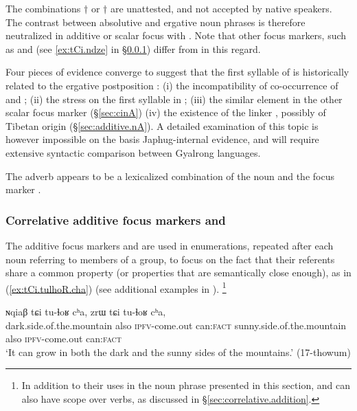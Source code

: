 The combinations $\dagger$ or $\dagger$ are unattested, and not accepted by native speakers. The contrast between absolutive and ergative noun phrases is therefore neutralized in additive or scalar focus with . Note that other focus markers, such as  and  (see \ref{ex:tCi.ndze} in §\ref{sec:ri.additive}) differ from  in this regard.

Four pieces of evidence converge to suggest that the first syllable of  is historically related to the ergative postposition : (i) the incompatibility of co-occurrence of  and ; (ii) the stress on the first syllable in ; (iii) the similar  element in the other scalar focus marker  (§\ref{sec:cinA}) (iv) the existence of the linker , possibly of Tibetan origin (§\ref{sec:additive.nA}). A detailed examination of this topic is however impossible on the basis Japhug-internal evidence, and will require extensive syntactic comparison between Gyalrong languages.

The adverb  appears to be a lexicalized combination of the noun  and the focus marker .

 \subsubsection{Correlative additive focus markers  and } \label{sec:ri.additive} 
 The additive focus markers  and   are used in enumerations, repeated after each noun referring to  members of a group, to focus on the fact that their referents share a common property (or properties that are semantically close enough), as in (\ref{ex:tCi.tulhoR.cha}) (see additional examples in \citealt[313--314]{jacques14linking}). \footnote{In addition to their uses in the noun phrase presented in this section,     and    can also have scope over verbs, as discussed in §\ref{sec:correlative.addition}. } 
  
 \begin{exe}
\ex \label{ex:tCi.tulhoR.cha}
 \gll  ɴqiaβ tɕi tu-ɬoʁ cʰa, zrɯ tɕi tu-ɬoʁ cʰa, \\
 dark.side.of.the.mountain also \textsc{ipfv}-come.out can:\textsc{fact}   sunny.side.of.the.mountain also \textsc{ipfv}-come.out can:\textsc{fact}  \\
 \glt `It can grow in both the dark and the sunny sides of the mountains.' (17-thowum)
\end{exe}
  
